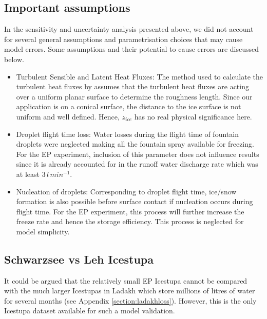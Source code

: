 \documentclass[utf8]{frontiersSCNS} %
\begin{document}
\subsection{Important assumptions}\label{section:assumptions} In the sensitivity and uncertainty analysis presented
above, we did not account for several general assumptions and parametrisation choices that may cause model errors.
Some assumptions and their potential to cause errors are discussed below.

\begin{itemize}

\item  Turbulent Sensible and Latent Heat Fluxes: The method used to calculate the turbulent heat fluxes by
  \cite{Garratt_1992} assumes that the turbulent heat fluxes are acting over a uniform planar surface to determine the
  roughness length. Since our application is on a conical surface, the distance to the ice surface is not
  uniform and well defined. Hence, $z_{ice}$ has no real physical significance here.

\item Droplet flight time loss: Water losses during the flight time of fountain droplets were neglected making all the
  fountain spray available for freezing. For the EP experiment, inclusion of this parameter does not influence
  results since it is already accounted for in the runoff water discharge rate which was at least $3\, l\,min^{-1}$.

\item Nucleation of droplets: Corresponding to droplet flight time, ice/snow formation is also possible before surface
  contact if nucleation occurs during flight time. For the EP experiment, this process will further increase
  the freeze rate and hence the storage efficiency. This process is neglected for model simplicity.

\end{itemize}

\subsection{Schwarzsee vs Leh Icestupa}
  
It could be argued that the relatively small EP Icestupa cannot be compared with the much larger Icestupas in
Ladakh which store millions of litres of water for several months (see Appendix \ref{section:ladakhloss}). However,
this is the only Icestupa dataset available for such a model validation.
\end{document}
